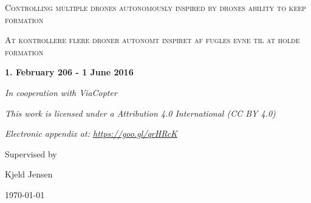 \begin{titlepage}
	\centering
	{\scshape\LARGE Controlling multiple drones autonomously inspired by drones ability to keep formation \par}
	\vspace{1cm}
	{\scshape\Large At kontrollere flere droner autonomt inspiret af fugles evne til at holde formation\par}
	\vspace{1.5cm}
	{\large\bfseries 1. February 206 - 1 June 2016\par}
	\vspace{2cm}
	{\Large\itshape In cooperation with ViaCopter\par}
	\vspace{2cm}
	{\Large\itshape  This work is licensed under a  Attribution 4.0 International (CC BY 4.0)\par}
		{\Large\itshape  Electronic appendix at: \url{https://goo.gl/qrHRcK}\par}
	\vfill
	Supervised by\par
	Kjeld Jensen

	\vfill

	{\large \today\par}
\end{titlepage}
